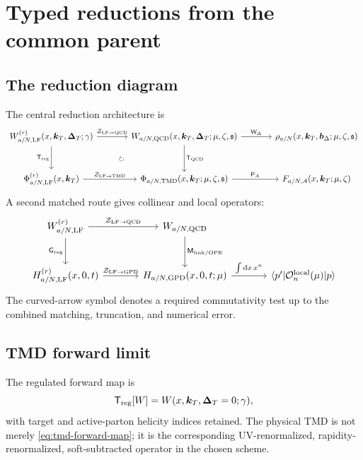 \documentclass[11pt]{article}
\newcommand{\kT}{\bm{k}_{T}}
\newcommand{\DT}{\bm{\Delta}_{T}}
\newcommand{\bD}{\bm{b}_{\Delta}}
\newcommand{\dd}{\mathrm{d}}
\newcommand{\LF}{\mathrm{LF}}
\newcommand{\TMD}{\mathrm{TMD}}
\newcommand{\GPD}{\mathrm{GPD}}
\newcommand{\cO}{\mathcal O}
\newcommand{\cZ}{\mathcal Z}
\begin{document}
\section{Typed reductions from the common parent}
\label{sec:reductions}

\subsection{The reduction diagram}

The central reduction architecture is
\begin{equation}
\begin{tikzcd}[column sep=large,row sep=large]
 W_{a/N,\LF}^{(r)}(x,\kT,\DT;\gamma)
 \arrow[r,"\cZ_{\LF\to\rm QCD}"]
 \arrow[d,"\mathsf T_{\rm reg}"']
 \arrow[dr,phantom,"\scriptstyle\circlearrowright"]
 & W_{a/N,\rm QCD}(x,\kT,\DT;\mu,\zeta,\mathfrak s)
 \arrow[d,"\mathsf T_{\rm QCD}"]
 \arrow[r,"\mathsf W_\Delta"]
 & \rho_{a/N}(x,\kT,\bD;\mu,\zeta,\mathfrak s)
 \\
 \Phi_{a/N,\LF}^{(r)}(x,\kT)
 \arrow[r,"\cZ_{\LF\to\TMD}"]
 & \Phi_{a/N,\TMD}(x,\kT;\mu,\zeta,\mathfrak s)
 \arrow[r,"\mathsf P_A"]
 & F_{a/N,A}(x,\kT;\mu,\zeta)
\end{tikzcd}
\label{eq:tmd-commuting-diagram}
\end{equation}
A second matched route gives collinear and local operators:
\begin{equation}
\begin{tikzcd}[column sep=large,row sep=large]
 W_{a/N,\LF}^{(r)}
 \arrow[r,"\cZ_{\LF\to\rm QCD}"]
 \arrow[d,"\mathsf G_{\rm reg}"']
 & W_{a/N,\rm QCD}
 \arrow[d,"\mathsf M_{\rm link/OPE}"]
 \\
 H_{a/N,\LF}^{(r)}(x,0,t)
 \arrow[r,"\cZ_{\LF\to\GPD}"]
 & H_{a/N,\GPD}(x,0,t;\mu)
 \arrow[r,"\int\dd x\,x^n"]
 & \langle p'|\cO_{n}^{\rm local}(\mu)|p\rangle
\end{tikzcd}
\label{eq:gpd-commuting-diagram}
\end{equation}
The curved-arrow symbol denotes a required commutativity test up to the
combined matching, truncation, and numerical error.

\subsection{TMD forward limit}

The regulated forward map is
\begin{equation}
 \mathsf T_{\rm reg}[W]
 =W(x,\kT,\DT=0;\gamma),
\label{eq:tmd-forward-map}
\end{equation}
with target and active-parton helicity indices retained.  The physical TMD is
not merely \cref{eq:tmd-forward-map}; it is the corresponding UV-renormalized,
rapidity-renormalized, soft-subtracted operator in the chosen scheme.
\end{document}
